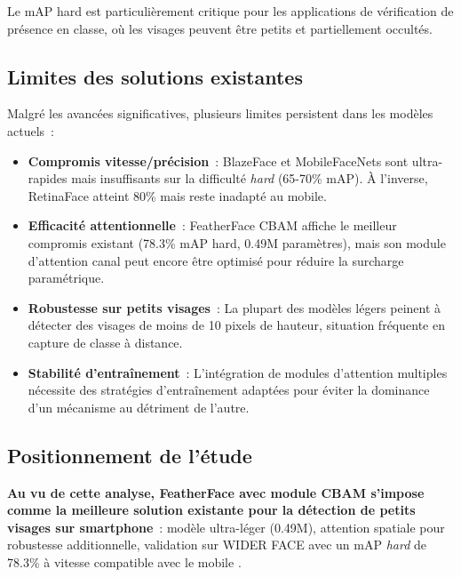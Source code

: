 \begin{onehalfspace}
\hspace{0.65 cm}Le mAP hard est particulièrement critique pour les applications de vérification de présence en classe, où les visages peuvent être petits et partiellement occultés.

\subsection{Limites des solutions existantes}

\hspace{0.65 cm}Malgré les avancées significatives, plusieurs limites persistent dans les modèles actuels~:

\begin{itemize}
\item \textbf{Compromis vitesse/précision}~: BlazeFace et MobileFaceNets sont ultra-rapides mais insuffisants sur la difficulté \textit{hard} (65-70\% mAP). À l'inverse, RetinaFace atteint 80\% mais reste inadapté au mobile.

\item \textbf{Efficacité attentionnelle}~: FeatherFace CBAM affiche le meilleur compromis existant (78.3\% mAP hard, 0.49M paramètres), mais son module d'attention canal peut encore être optimisé pour réduire la surcharge paramétrique.

\item \textbf{Robustesse sur petits visages}~: La plupart des modèles légers peinent à détecter des visages de moins de 10 pixels de hauteur, situation fréquente en capture de classe à distance.

\item \textbf{Stabilité d'entraînement}~: L'intégration de modules d'attention multiples nécessite des stratégies d'entraînement adaptées pour éviter la dominance d'un mécanisme au détriment de l'autre.
\end{itemize}

\subsection{Positionnement de l'étude}

\hspace{0.65 cm}\textbf{Au vu de cette analyse, FeatherFace avec module CBAM s'impose comme la meilleure solution existante pour la détection de petits visages sur smartphone}~: modèle ultra-léger (0.49M), attention spatiale pour robustesse additionnelle, validation sur WIDER FACE avec un mAP \textit{hard} de 78.3\% à vitesse compatible avec le mobile \cite{Kim2025FeatherFace, Woo2018CBAM}.


\end{onehalfspace}
